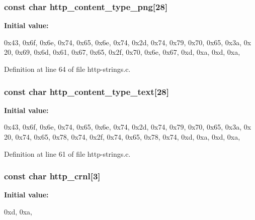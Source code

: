 \hypertarget{http-strings_8c_a371c581997fc6a5803c3551e33be77db}{
\subsubsection[{http\_\-content\_\-type\_\-png}]{\setlength{\rightskip}{0pt plus 5cm}const char {\bf http\_\-content\_\-type\_\-png}\mbox{[}28\mbox{]}}}
\label{http-strings_8c_a371c581997fc6a5803c3551e33be77db}
{\bfseries Initial value:}
\begin{DoxyCode}
 

{0x43, 0x6f, 0x6e, 0x74, 0x65, 0x6e, 0x74, 0x2d, 0x74, 0x79, 0x70, 0x65, 0x3a, 0x
      20, 0x69, 0x6d, 0x61, 0x67, 0x65, 0x2f, 0x70, 0x6e, 0x67, 0xd, 0xa, 0xd, 0xa, }
\end{DoxyCode}


Definition at line 64 of file http-\/strings.c.

\hypertarget{http-strings_8c_aed57746b7fb18ac9361cfa7dc05c9782}{
\subsubsection[{http\_\-content\_\-type\_\-text}]{\setlength{\rightskip}{0pt plus 5cm}const char {\bf http\_\-content\_\-type\_\-text}\mbox{[}28\mbox{]}}}
\label{http-strings_8c_aed57746b7fb18ac9361cfa7dc05c9782}
{\bfseries Initial value:}
\begin{DoxyCode}
 

{0x43, 0x6f, 0x6e, 0x74, 0x65, 0x6e, 0x74, 0x2d, 0x74, 0x79, 0x70, 0x65, 0x3a, 0x
      20, 0x74, 0x65, 0x78, 0x74, 0x2f, 0x74, 0x65, 0x78, 0x74, 0xd, 0xa, 0xd, 0xa, }
\end{DoxyCode}


Definition at line 61 of file http-\/strings.c.

\hypertarget{http-strings_8c_af2e1f75e5b640c00f89dd6d9598d08a2}{
\subsubsection[{http\_\-crnl}]{\setlength{\rightskip}{0pt plus 5cm}const char {\bf http\_\-crnl}\mbox{[}3\mbox{]}}}
\label{http-strings_8c_af2e1f75e5b640c00f89dd6d9598d08a2}
{\bfseries Initial value:}
\begin{DoxyCode}
 

{0xd, 0xa, }
\end{DoxyCode}


